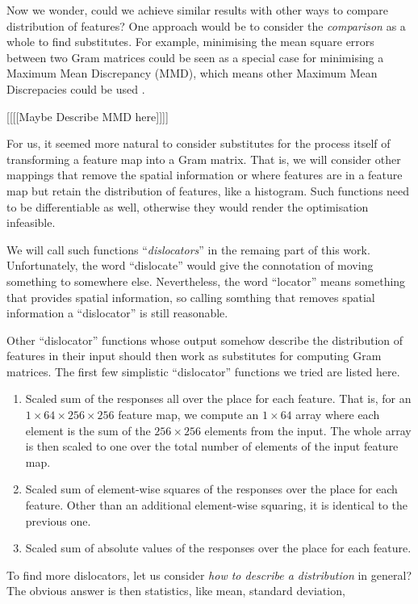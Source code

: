 \documentclass[runningheads]{llncs}
\begin{document}
Now we wonder, could we achieve similar results with other ways to compare 
distribution of features?
One approach would be to consider the \emph{comparison} as a whole to find 
substitutes. 
For example, minimising the mean square errors between two Gram matrices could be seen as 
a special case for minimising a Maximum Mean Discrepancy (MMD), which means other Maximum Mean Discrepacies
could be used \cite{MMD}.

[[[[Maybe Describe MMD here]]]]

For us, it seemed more natural to consider substitutes for the process itself of 
transforming a feature map into a Gram matrix. 
That is, we will consider other
mappings that remove the spatial information or where features are in a feature map but retain
the distribution of features, like a histogram.
Such functions need to be differentiable as well, otherwise they would render the 
optimisation infeasible.

We will call such functions ``\emph{dislocators}'' in the remaing part of this work.
Unfortunately, the word ``dislocate'' would give the connotation of moving something to somewhere else.
Nevertheless, the word ``locator'' means something that provides spatial information,
so calling somthing that removes spatial information a ``dislocator'' is still reasonable.

Other ``dislocator'' functions whose output somehow describe the 
distribution of features in their input should then work as substitutes
for computing Gram matrices.
The first few simplistic ``dislocator'' functions we tried are listed here.
\begin{enumerate}
\item Scaled sum of the responses all over the place for each feature.
That is, for an $1\times64\times256\times256$ feature map,
we compute an $1\times64$ array where each element is the sum of the
$256\times256$ elements from the input.
The whole array is then scaled to one over the total number of elements of the input feature map.
\item Scaled sum of element-wise squares of the responses over the place for each feature.
Other than an additional element-wise squaring, it is identical to the previous one.
\item Scaled sum of absolute values of the responses over the place for each feature.
\end{enumerate}

To find more dislocators, let us consider \emph{how to describe a distribution} in general?
The obvious answer is then statistics, like mean, standard deviation, 
\end{document}
